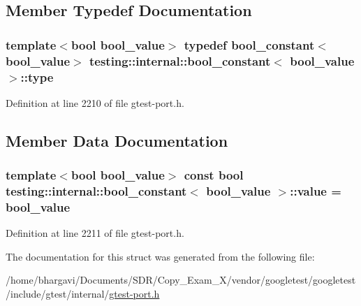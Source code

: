 \subsection{Member Typedef Documentation}
\subsubsection[{\texorpdfstring{type}{type}}]{\setlength{\rightskip}{0pt plus 5cm}template$<$bool bool\+\_\+value$>$ typedef {\bf bool\+\_\+constant}$<$bool\+\_\+value$>$ {\bf testing\+::internal\+::bool\+\_\+constant}$<$ bool\+\_\+value $>$\+::{\bf type}}\hypertarget{structtesting_1_1internal_1_1bool__constant_aba6d09ecf7eecea6c93480f0d627a167}{}\label{structtesting_1_1internal_1_1bool__constant_aba6d09ecf7eecea6c93480f0d627a167}


Definition at line 2210 of file gtest-\/port.\+h.



\subsection{Member Data Documentation}
\subsubsection[{\texorpdfstring{value}{value}}]{\setlength{\rightskip}{0pt plus 5cm}template$<$bool bool\+\_\+value$>$ const bool {\bf testing\+::internal\+::bool\+\_\+constant}$<$ bool\+\_\+value $>$\+::value = bool\+\_\+value\hspace{0.3cm}{\ttfamily [static]}}\hypertarget{structtesting_1_1internal_1_1bool__constant_a499fba6576296b04d99690a486424b32}{}\label{structtesting_1_1internal_1_1bool__constant_a499fba6576296b04d99690a486424b32}


Definition at line 2211 of file gtest-\/port.\+h.



The documentation for this struct was generated from the following file\+:\begin{DoxyCompactItemize}
\item 
/home/bhargavi/\+Documents/\+S\+D\+R/\+Copy\+\_\+\+Exam\+\_\+X/vendor/googletest/googletest/include/gtest/internal/\hyperlink{gtest-port_8h}{gtest-\/port.\+h}\end{DoxyCompactItemize}
